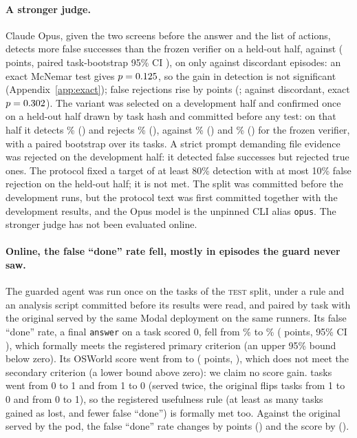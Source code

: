 
\paragraph{A stronger judge.} Claude Opus, given the two screens before the answer and the list of actions, detects more false successes than the frozen verifier on a held-out half, \gvTwoDet{} against \gvOneDet{} (\gvDetDiff{} points, paired task-bootstrap 95\% CI \gvDetDiffCi), on only \exGvDetBetter{} against \exGvDetWorse{} discordant episodes: an exact McNemar test gives $p=0.125$, so the gain in detection is not significant (Appendix~\ref{app:exact}); false rejections rise by \gvRejDiff{} points (\gvRejDiffCi; \exGvRejBetter{} against \exGvRejWorse{} discordant, exact $p=0.302$). The variant was selected on a development half and confirmed once on a held-out half drawn by task hash and committed before any test: on that half it detects \gvTwoDetPct\% (\gvTwoDet) and rejects \gvTwoRejPct\% (\gvTwoRej), against \gvOneDetPct\% (\gvOneDet) and \gvOneRejPct\% (\gvOneRej) for the frozen verifier, with a paired bootstrap over its \gvTasks{} tasks. A strict prompt demanding file evidence was rejected on the development half: it detected \gvStrictDet{} false successes but rejected \gvStrictRej{} true ones. The protocol fixed a target of at least 80\% detection with at most 10\% false rejection on the held-out half; it is not met. The split was committed before the development runs, but the protocol text was first committed together with the development results, and the Opus model is the unpinned CLI alias \texttt{opus}. The stronger judge has not been evaluated online. %

\paragraph{Online, the false ``done'' rate fell, mostly in episodes the guard never saw.} The guarded agent was run once on the \OgN{} tasks of the \textsc{test} split, under a rule and an analysis script committed before its results were read, and paired by task with the original served by the same Modal deployment on the same runners. Its false ``done'' rate, a final \texttt{answer} on a task scored 0, fell from \OgFdBase\% to \OgFdGuard\% (\OgFdDiff{} points, 95\% CI \OgFdDiffCi), which formally meets the registered primary criterion (an upper 95\% bound below zero). Its OSWorld score went from \OgScoreBase{} to \OgScoreGuard{} (\OgScoreDiff{} points, \OgScoreDiffCi), which does not meet the secondary criterion (a lower bound above zero): we claim no score gain. \OgB{} tasks went from 0 to 1 and \OgC{} from 1 to 0 (served twice, the original flips \ogNoiseDown{} tasks from 1 to 0 and \ogNoiseUp{} from 0 to 1), so the registered usefulness rule (at least as many tasks gained as lost, and fewer false ``done'') is formally met too. Against the original served by the pod, the false ``done'' rate changes by \OgpodFdDiff{} points (\OgpodFdDiffCi) and the score by \OgpodScoreDiff{} (\OgpodScoreDiffCi).

